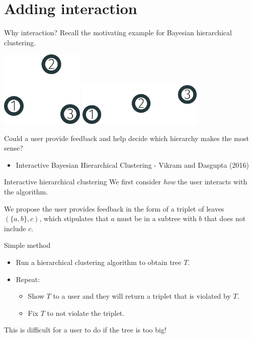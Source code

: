 \documentclass[10pt, compress]{beamer}
\begin{document}
\section{Adding interaction}

\begin{frame}{Why interaction?}
  Recall the motivating example for Bayesian hierarchical clustering.
  \begin{center}
  \includegraphics[width=0.3\textwidth]{img/3-cluster}\hfill
  \includegraphics[width=0.45\textwidth]{img/3-cluster-line}
  \end{center}
  Could a user provide feedback and help decide which hierarchy
  makes the most sense?
  \begin{itemize}
    \item Interactive Bayesian Hierarchical Clustering - Vikram and Dasgupta (2016) \cite{Vikram2016}
  \end{itemize}
\end{frame}

\begin{frame}{Interactive hierarchical clustering}
  We first consider \emph{how} the user interacts
  with the algorithm.

  We propose the user provides feedback in the form
  of a \alert{triplet} of leaves $(\{a, b\}, c)$, which stipulates
  that $a$ must be in a subtree with $b$ that does not
  include $c$.

  \begin{block}{Simple method}
    \begin{itemize}
      \item Run a hierarchical clustering algorithm to obtain tree $T$.
      \item Repeat:
        \begin{itemize}
          \item Show $T$ to a user and they will return a triplet that is violated by $T$.
          \item Fix $T$ to not violate the triplet.
        \end{itemize}
    \end{itemize}
  \end{block}

  This is difficult for a user to do if the tree is too big!

\end{frame}
\end{document}
